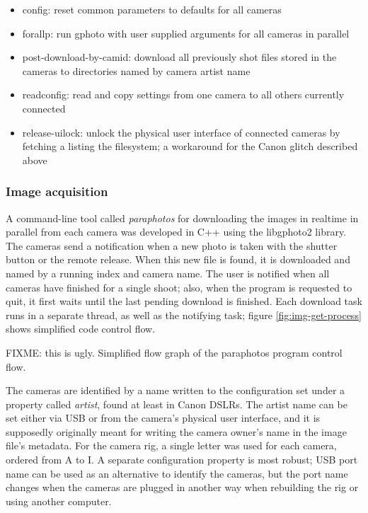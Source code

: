 \begin{itemize}
\item config: reset common parameters to defaults for all cameras
\item forallp: run gphoto with user supplied arguments for all cameras in parallel
\item post-download-by-camid: download all previously shot files stored in the cameras to directories named by camera artist name
\item readconfig: read and copy settings from one camera to all others currently connected
\item release-uilock: unlock the physical user interface of connected cameras by fetching a listing the filesystem; a workaround for the Canon glitch described above
\end{itemize}



\subsubsection{Image acquisition} %

A command-line tool called \emph{paraphotos} for downloading the images in realtime in parallel from each camera was developed in C++ using the libgphoto2 library.
The cameras send a notification when a new photo is taken with the shutter button or the remote release.
When this new file is found, it is downloaded and named by a running index and camera name.
The user is notified when all cameras have finished for a single shoot; also, when the program is requested to quit, it first waits until the last pending download is finished.
Each download task runs in a separate thread, as well as the notifying task; figure \ref{fig:img-get-process} shows simplified code control flow.

{FIXME: this is ugly. Simplified flow graph of the paraphotos program control flow.}

The cameras are identified by a name written to the configuration set under a property called \emph{artist}, found at least in Canon DSLRs.
The artist name can be set either via USB or from the camera's physical user interface, and it is supposedly originally meant for writing the camera owner's name in the image file's metadata.
For the camera rig, a single letter was used for each camera, ordered from A to I.
A separate configuration property is most robust; USB port name can be used as an alternative to identify the cameras, but the port name changes when the cameras are plugged in another way when rebuilding the rig or using another computer.

